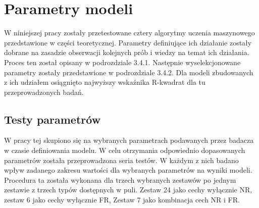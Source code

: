 \clearpage
\section{Parametry modeli}
\label{cha:drugiDokument}
W niniejszej pracy zostały przetestowane cztery algorytmy uczenia maszynowego przedstawione w części teoretycznej. Parametry definiujące ich działanie zostały dobrane na zasadzie obserwacji kolejnych prób i wiedzy na temat ich działania. Proces ten został opisany w podrozdziale 3.4.1. Następnie wyselekcjonowane parametry zostały przedstawione w podrozdziale 3.4.2. Dla modeli zbudowanych z ich udziałem osiągnięto najwyższy wskaźnika R-kwadrat dla tu przeprowadzonych badań.

\subsection{Testy parametrów}
W pracy tej skupiono się na wybranych parametrach podawanych  przez badacza w czasie definiowania modelu. W celu otrzymania odpowiednio dopasowanych parametrów została przeprowadzona seria testów. W każdym z nich badano wpływ zadanego zakresu wartości dla wybranych parametrów na wyniki modeli. Procedura ta została wykonana dla trzech wybranych zestawów  po jednym zestawie z trzech typów dostępnych w puli. Zestaw 24 jako cechy wyłącznie NR, zestaw 6 jako cechy wyłącznie FR, Zestaw 7 jako kombinacja cech NR i FR. 

\vspace{5mm}

